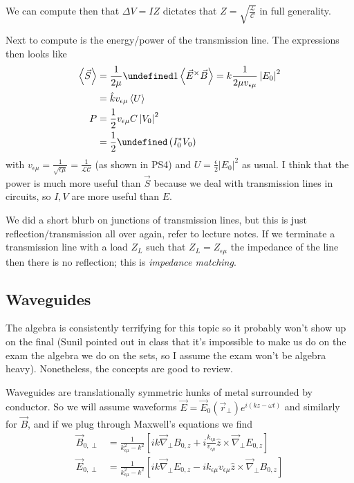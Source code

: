 \documentclass[10pt,twocolumn]{article}
\newcommand{\abs}[1]{\left|#1\right|}
\let\Re\undefined
\DeclareMathOperator{\Re}{Re}
\newcommand{\expvalue}[1]{\left<#1\right>}
\begin{document}
We can compute then that $\Delta V = IZ$ dictates that $Z = \sqrt{\frac{\mathcal{L}}{\mathcal{C}}}$ in full generality. 

Next to compute is the energy/power of the transmission line. The expressions then looks like
\begin{align}
    \expvalue{\vec{S}} &= \frac{1}{2\mu}\Re1\expvalue{\vec{E}^ \times \vec{B}} = k\frac{1}{2\mu v_{\epsilon \mu}}\abs{E_0}^2\\
    &= \hat{k}v_{\epsilon \mu}\expvalue{U}\\
    P &= \frac{1}{2}v_{\epsilon \mu}C\abs{V_0}^2\\
    &= \frac{1}{2}\Re\left( I_0^*V_0 \right)
\end{align}
with $v_{\epsilon \mu} = \frac{1}{\sqrt{\epsilon \mu}} = \frac{1}{\mathcal{LC}}$ (as shown in PS4) and $U = \frac{\epsilon}{2} \abs{E_0}^2$ as usual. I think that the power is much more useful than $\vec{S}$ because we deal with transmission lines in circuits, so $I,V$ are more useful than $E$.

We did a short blurb on junctions of transmission lines, but this is just reflection/transmission all over again, refer to lecture notes. If we terminate a transmission line with a load $Z_L$ such that $Z_L = Z_{\epsilon \mu}$ the impedance of the line then there is no reflection; this is \emph{impedance matching}.

\subsection{Waveguides}

The algebra is consistently terrifying for this topic so it probably won't show up on the final (Sunil pointed out in class that it's impossible to make us do on the exam the algebra we do on the sets, so I assume the exam won't be algebra heavy). Nonetheless, the concepts are good to review.

Waveguides are translationally symmetric hunks of metal surrounded by conductor. So we will assume waveforms $\vec{E} = \vec{E}_0(\vec{r}_{\perp}) e^{i(kz - \omega t)}$ and similarly for $\vec{B}$, and if we plug through Maxwell's equations we find
\begin{align}
    \vec{B}_{0,\perp} &= \frac{1}{k_{\epsilon \mu}^2 - k^2}\left[ ik\vec{\nabla}_{\perp}B_{0,z} + i\frac{k_{\epsilon\mu}}{v_{\epsilon \mu}}\hat{z}\times \vec{\nabla}_{\perp}E_{0,z} \right]\\
    \vec{E}_{0,\perp} &= \frac{1}{k_{\epsilon \mu}^2 - k^2}\left[ ik\vec{\nabla}_{\perp}E_{0,z} - ik_{\epsilon\mu}v_{\epsilon \mu}\hat{z}\times \vec{\nabla}_{\perp}B_{0,z} \right]\label{MEWG}
\end{align}
\end{document}
